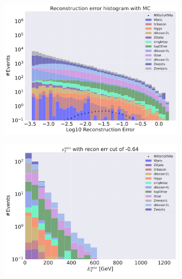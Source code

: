 \begin{figure}[H]
    \centering
    \begin{subfigure}{.49\textwidth}
        \includegraphics[width=\textwidth]{Figures/AE_testing/big/3lep/b_data_recon_big_rm3_feats_sig_800p0p050p.pdf}
        \caption{ }
        \label{fig:AE_3lep_big_800_3}
    \end{subfigure}
    \hfill
    \begin{subfigure}{.49\textwidth}
        \includegraphics[width=\textwidth]{Figures/AE_testing/big/3lep/b_data_recon_big_rm3_feats_sig_800p0p050p_etmiss_recon_errcut_-0.64.pdf}
        \caption{}
        \label{fig:AE_3lep_big_etmiss_800_3}
    \end{subfigure}

\end{figure}
